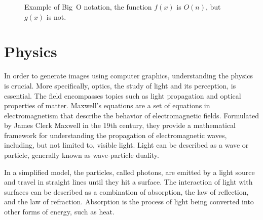 \begin{figure}[H]
  \centering
  \caption{Example of Big~O notation, the function $f(x)$ is $O(n)$, but $g(x)$ is not.}
  \label{fig:big-o-visualization}
\end{figure}

\section{Physics}
\label{ch:physics}

In order to generate images using computer graphics, understanding the physics is crucial. More specifically, optics, the study of light and its perception, is essential. The field encompasses topics such as light propagation and optical properties of matter. Maxwell's equations are a set of equations in electromagnetism that describe the behavior of electromagnetic fields. Formulated by James Clerk Maxwell in the 19th century, they provide a mathematical framework for understanding the propagation of electromagnetic waves, including, but not limited to, visible light. Light can be described as a wave or particle, generally known as wave-particle duality. \cite{fowles1989introduction}

In a simplified model, the particles, called photons, are emitted by a light source and travel in straight lines until they hit a surface. The interaction of light with surfaces can be described as a combination of absorption, the law of reflection, and the law of refraction. Absorption is the process of light being converted into other forms of energy, such as heat.

